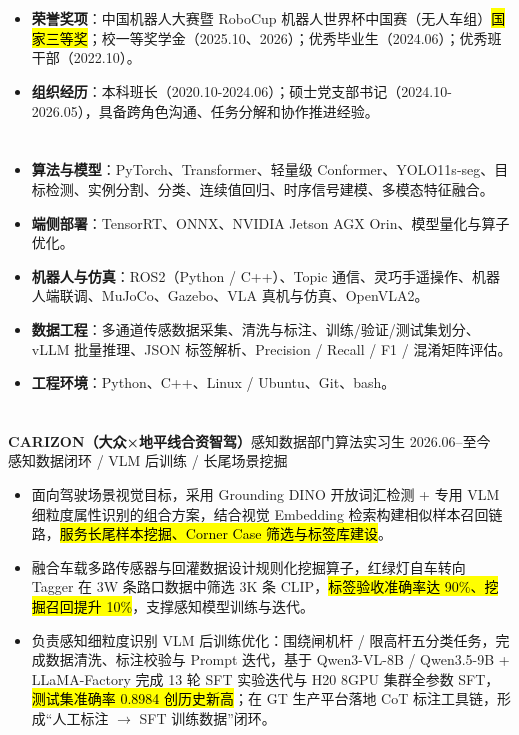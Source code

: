 \section[荣誉与组织经历]{}
\begin{itemize}
    \item {\textbf{荣誉奖项}}：中国机器人大赛暨 RoboCup 机器人世界杯中国赛（无人车组）\hl{国家三等奖}；校一等奖学金（2025.10、2026）；优秀毕业生（2024.06）；优秀班干部（2022.10）。
    \item {\textbf{组织经历}}：本科班长（2020.10-2024.06）；硕士党支部书记（2024.10-2026.05），具备跨角色沟通、任务分解和协作推进经验。
\end{itemize}

\section[专业技能]{}
\begin{itemize}
    \item \textbf{算法与模型}：PyTorch、Transformer、轻量级 Conformer、YOLO11s-seg、目标检测、实例分割、分类、连续值回归、时序信号建模、多模态特征融合。
    \item \textbf{端侧部署}：TensorRT、ONNX、NVIDIA Jetson AGX Orin、模型量化与算子优化。
    \item \textbf{机器人与仿真}：ROS2（Python / C++）、Topic 通信、灵巧手遥操作、机器人端联调、MuJoCo、Gazebo、VLA 真机与仿真、OpenVLA2。
    \item \textbf{数据工程}：多通道传感数据采集、清洗与标注、训练/验证/测试集划分、vLLM 批量推理、JSON 标签解析、Precision / Recall / F1 / 混淆矩阵评估。
    \item \textbf{工程环境}：Python、C++、Linux / Ubuntu、Git、bash。
\end{itemize}

\section[实习经历]{}
{\small\textbf{CARIZON（大众×地平线合资智驾）}}\quad 感知数据部门算法实习生 \hfill {2026.06--至今} \\
{\scriptsize\color{WHU_Blue} 感知数据闭环 / VLM 后训练 / 长尾场景挖掘}
\begin{itemize}
    \item 面向驾驶场景视觉目标，采用 Grounding DINO 开放词汇检测 + 专用 VLM 细粒度属性识别的组合方案，结合视觉 Embedding 检索构建相似样本召回链路，\hl{服务长尾样本挖掘、Corner Case 筛选与标签库建设}。
    \item 融合车载多路传感器与回灌数据设计规则化挖掘算子，红绿灯自车转向 Tagger 在 3W 条路口数据中筛选 3K 条 CLIP，\hl{标签验收准确率达 90\%、挖掘召回提升 10\%}，支撑感知模型训练与迭代。
    \item 负责感知细粒度识别 VLM 后训练优化：围绕闸机杆 / 限高杆五分类任务，完成数据清洗、标注校验与 Prompt 迭代，基于 Qwen3-VL-8B / Qwen3.5-9B + LLaMA-Factory 完成 13 轮 SFT 实验迭代与 H20 8GPU 集群全参数 SFT，\hl{测试集准确率 0.8984 创历史新高}；在 GT 生产平台落地 CoT 标注工具链，形成“人工标注 $\rightarrow$ SFT 训练数据”闭环。
\end{itemize}

